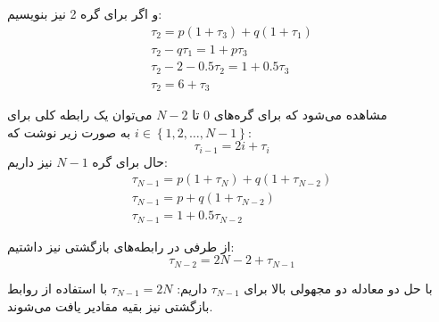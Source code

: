 \begin{enumerate}[label=(\alph*)]
	و اگر برای گره 2 نیز بنویسیم:
	$$
	\begin{array}{c}
		{\tau _2} = p(1 + {\tau _3}) + q(1 + {\tau _1})\\
		{\tau _2} - q{\tau _1} = 1 + p{\tau _3}\\
		{\tau _2} - 2 - 0.5{\tau _2} = 1 + 0.5{\tau _3}\\
		{\tau _2} = 6 + {\tau _3}
	\end{array}
	$$
	
	مشاهده می‌شود که برای گره‌های 0 تا
	$N-2$
	می‌توان یک رابطه کلی برای
	$i \in \left\{ {1,2, \ldots ,N - 1} \right\}$
	به صورت زیر نوشت که:
	$$
	{\tau _{i - 1}} = 2i + {\tau _i}
	$$
	حال برای گره
	$N-1$
	نیز داریم:
	$$
	\begin{array}{c}
		{\tau _{N - 1}} = p(1 + {\tau _N}) + q(1 + {\tau _{N - 2}})\\
		{\tau _{N - 1}} = p + q(1 + {\tau _{N - 2}})\\
		{\tau _{N - 1}} = 1 + 0.5{\tau _{N - 2}}
	\end{array}
	$$
	
	از طرفی در رابطه‌های بازگشتی نیز داشتیم:
	$$
	{\tau _{N - 2}} = 2N - 2 + {\tau _{N - 1}}
	$$
	
	با حل دو معادله دو مجهولی بالا برای
	${\tau _{N - 1}}$
	داریم:
	${\tau _{N - 1}} = 2N$
	با استفاده از روابط بازگشتی نیز بقیه مقادیر یافت می‌شوند.
\end{enumerate}
